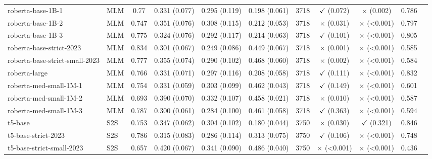 \begin{table}[]
\begin{adjustbox}{max width=\textwidth}
\begin{tabular}{llccccccccc}
roberta-base-1B-1 & MLM & 0.77 & 0.331 (0.077) & 0.295 (0.119) & 0.198 (0.061) & 3718 & $\checkmark$ (0.072) & $\times$ (0.002) & 0.786 \\
roberta-base-1B-2 & MLM & 0.747 & 0.351 (0.076) & 0.308 (0.115) & 0.212 (0.053) & 3718 & $\times$ (0.031) & $\times$ (<0.001) & 0.797 \\
roberta-base-1B-3 & MLM & 0.775 & 0.324 (0.076) & 0.292 (0.117) & 0.214 (0.063) & 3718 & $\checkmark$ (0.101) & $\times$ (<0.001) & 0.805 \\
roberta-base-strict-2023 & MLM & 0.834 & 0.301 (0.067) & 0.249 (0.086) & 0.449 (0.067) & 3718 & $\times$ (0.001) & $\times$ (<0.001) & 0.585 \\
roberta-base-strict-small-2023 & MLM & 0.777 & 0.355 (0.074) & 0.290 (0.102) & 0.468 (0.060) & 3718 & $\times$ (0.002) & $\times$ (<0.001) & 0.584 \\
roberta-large & MLM & 0.766 & 0.331 (0.071) & 0.297 (0.116) & 0.208 (0.058) & 3718 & $\checkmark$ (0.111) & $\times$ (<0.001) & 0.832 \\
roberta-med-small-1M-1 & MLM & 0.754 & 0.331 (0.059) & 0.303 (0.099) & 0.462 (0.043) & 3718 & $\checkmark$ (0.149) & $\times$ (<0.001) & 0.601 \\
roberta-med-small-1M-2 & MLM & 0.693 & 0.390 (0.070) & 0.332 (0.107) & 0.458 (0.021) & 3718 & $\times$ (0.010) & $\times$ (<0.001) & 0.587 \\
roberta-med-small-1M-3 & MLM & 0.787 & 0.300 (0.061) & 0.284 (0.100) & 0.461 (0.058) & 3718 & $\checkmark$ (0.363) & $\times$ (<0.001) & 0.594 \\
t5-base & S2S & 0.753 & 0.347 (0.062) & 0.304 (0.102) & 0.180 (0.044) & 3750 & $\times$ (0.030) & $\checkmark$ (0.321) & 0.846 \\
t5-base-strict-2023 & S2S & 0.786 & 0.315 (0.083) & 0.286 (0.114) & 0.313 (0.075) & 3750 & $\checkmark$ (0.106) & $\times$ (<0.001) & 0.748 \\
t5-base-strict-small-2023 & S2S & 0.657 & 0.420 (0.067) & 0.341 (0.090) & 0.486 (0.040) & 3750 & $\times$ (<0.001) & $\times$ (<0.001) & 0.436 \\
\bottomrule
\end{tabular}
\end{adjustbox}
\end{table}